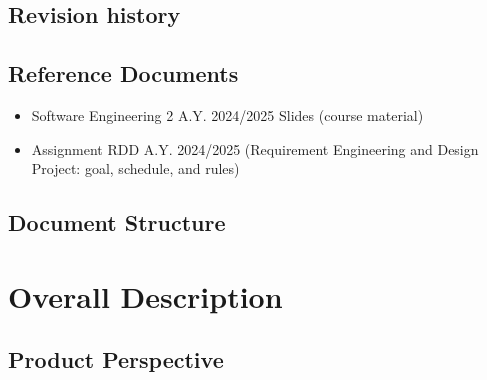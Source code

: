\documentclass{article}
\begin{document}
\subsection{Revision history}
\subsection{Reference Documents}
    \begin{itemize}
        \item Software Engineering 2 A.Y. 2024/2025 Slides (course material)
        \item Assignment RDD A.Y. 2024/2025 (Requirement Engineering and Design Project: goal, schedule, and rules)
    \end{itemize}

\subsection{Document Structure}

\section{Overall Description}
\subsection{Product Perspective}
\end{document}
